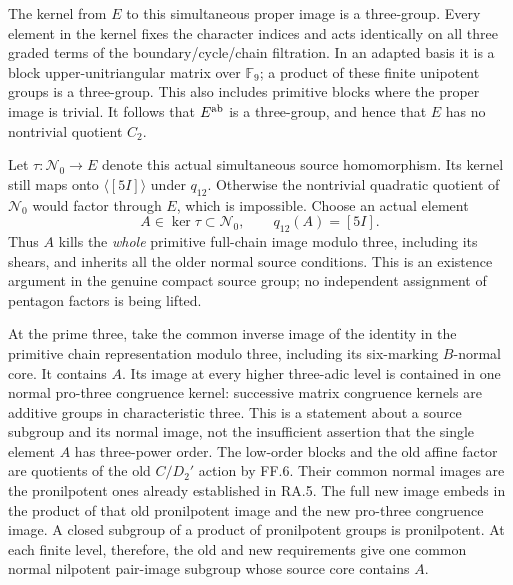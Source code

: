 The kernel from $E$ to this simultaneous proper image is a
three-group. Every element in the kernel fixes the character
indices and acts identically on all three graded terms of
the boundary/cycle/chain filtration. In an adapted basis it
is a block upper-unitriangular matrix over $\mathbb F_9$;
a product of these finite unipotent groups is a three-group.
This also includes primitive blocks where the proper image
is trivial. It follows that $E^{\rm ab}$ is a three-group,
and hence that $E$ has no nontrivial quotient $C_2$.

Let $\tau:\mathcal N_0\to E$ denote this actual simultaneous
source homomorphism. Its kernel still maps onto
$\langle[5I]\rangle$ under $q_{12}$. Otherwise the nontrivial
quadratic quotient of $\mathcal N_0$ would factor through
$E$, which is impossible. Choose an actual element
\[
       A\in\ker\tau\subset\mathcal N_0,
                    \qquad q_{12}(A)=[5I].
 \tag{FF.7b}
\]
Thus $A$ kills the \emph{whole} primitive full-chain image
modulo three, including its shears, and inherits all the
older normal source conditions. This is an existence
argument in the genuine compact source group; no independent
assignment of pentagon factors is being lifted.

At the prime three, take the common inverse image of the
identity in the primitive chain representation modulo three,
including its six-marking $B$-normal core. It contains $A$.
Its image at every higher three-adic level is contained in
one normal pro-three congruence kernel: successive matrix
congruence kernels are additive groups in characteristic
three. This is a statement about a source subgroup and its
normal image, not the insufficient assertion that the single
element $A$ has three-power order. The low-order blocks and
the old affine factor are quotients of the old $C/D_2'$ action
by FF.6. Their common normal images are the pronilpotent
ones already established in RA.5. The full new image embeds
in the product of that old pronilpotent image and the new
pro-three congruence image. A closed subgroup of a product
of pronilpotent groups is pronilpotent. At each finite
level, therefore, the old and new requirements give one
common normal nilpotent pair-image subgroup whose source
core contains $A$.

